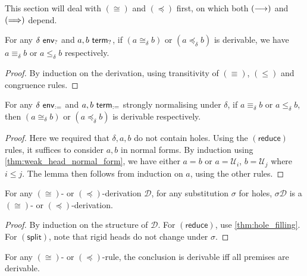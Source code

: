 \documentclass[twoside]{report}
\begin{document}
This section will deal with $(\cong)$ and $(\preceq)$ first, on which both $(\longrightarrow)$ and $(\Longrightarrow)$ depend.

\begin{proposition}
\label{thm:conversion_calculus_soundness}
For any $\delta \ \mathsf{env}_{?}$ and $a, b \ \mathsf{term}_{?}$, if $(a \cong_\delta b)$ or $(a \preceq_\delta b)$ is derivable, we have $a \equiv_\delta b$ or $a \leq_\delta b$ respectively.
\end{proposition}

\begin{proof}
By induction on the derivation, using transitivity of $(\equiv)$, $(\leq)$ and congruence rules.
\end{proof}

\begin{proposition}
\label{thm:conversion_calculus_completeness}
For any $\delta \ \mathsf{env}_{:=}$ and $a, b \ \mathsf{term}_{:=}$ strongly normalising under $\delta$, if $a \equiv_\delta b$ or $a \leq_\delta b$, then $(a \cong_\delta b)$ or $(a \preceq_\delta b)$ is derivable respectively.
\end{proposition}

\begin{proof}
Here we required that $\delta, a, b$ do not contain holes. Using the $(\mathsf{reduce})$ rules, it suffices to consider $a, b$ in normal forms. By induction using \cref{thm:weak_head_normal_form}, we have either $a = b$ or $a = \mathcal U_i$, $b = \mathcal U_j$ where $i \leq j$. The lemma then follows from induction on $a$, using the other rules.
\end{proof}

\begin{proposition}
\label{thm:conversion_calculus_stability}
For any $(\cong)$- or $(\preceq)$-derivation $\mathcal D$, for any substitution $\sigma$ for holes, $\sigma \mathcal D$ is a $(\cong)$- or $(\preceq)$-derivation.
\end{proposition}

\begin{proof}
By induction on the structure of $\mathcal D$. For $(\mathsf{reduce})$, use \cref{thm:hole_filling}. For $(\mathsf{split})$, note that rigid heads do not change under $\sigma$.
\end{proof}

\begin{proposition}
\label{thm:conversion_calculus_inversion}
For any $(\cong)$- or $(\preceq)$-rule, the conclusion is derivable iff all premises are derivable.
\end{proposition}
\end{document}
